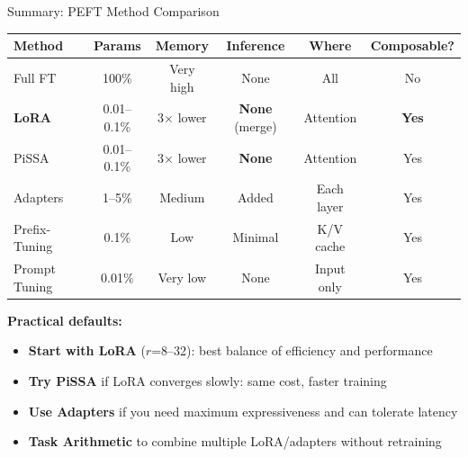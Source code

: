 \documentclass[aspectratio=169]{beamer}
\begin{document}
\begin{frame}{Summary: PEFT Method Comparison}
  \small
  \begin{center}
  \footnotesize
  \setlength{\tabcolsep}{4pt}
  \begin{tabular}{p{2.0cm}ccccc}
    \toprule
    \textbf{Method} & \textbf{Params} & \textbf{Memory} & \textbf{Inference} & \textbf{Where} & \textbf{Composable?} \\
    \midrule
    Full FT & 100\% & Very high & None & All & No \\
    \textbf{LoRA} & 0.01--0.1\% & 3$\times$ lower & \textbf{None} (merge) & Attention & \textbf{Yes} \\
    PiSSA & 0.01--0.1\% & 3$\times$ lower & \textbf{None} & Attention & Yes \\
    Adapters & 1--5\% & Medium & Added & Each layer & Yes \\
    Prefix-Tuning & 0.1\% & Low & Minimal & K/V cache & Yes \\
    Prompt Tuning & 0.01\% & Very low & None & Input only & Yes \\
    \bottomrule
  \end{tabular}
  \end{center}

  \vspace{8pt}
  \textbf{Practical defaults:}
  \begin{itemize}
    \item \textbf{Start with LoRA} ($r$=8--32): best balance of efficiency and performance
    \item \textbf{Try PiSSA} if LoRA converges slowly: same cost, faster training
    \item \textbf{Use Adapters} if you need maximum expressiveness and can tolerate latency
    \item \textbf{Task Arithmetic} to combine multiple LoRA/adapters without retraining
  \end{itemize}

\end{frame}
\end{document}
